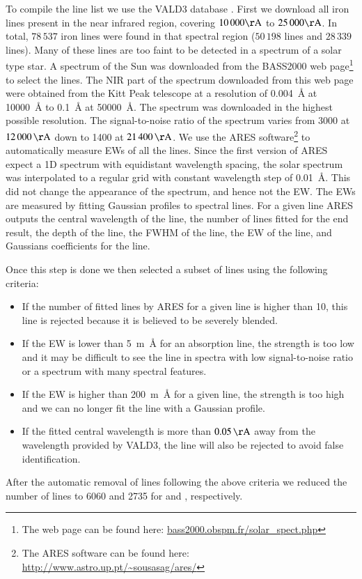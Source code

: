 \documentclass{aa}
\begin{document}
To compile the line list we use the VALD3 database \citep{VALD1,VALD2}.
First we download all iron lines present in the near infrared
region, covering $10\,000\si{\AA}$ to $25\,000\si{\AA}$. In
total, $78\,537$ iron lines were found in that spectral region
($50\,198$  lines and $28\,339$  lines).
Many of these lines are too faint to be detected in a spectrum
of a solar type star. A spectrum of the Sun was downloaded from
the BASS2000 web page\footnote{The web page can be found here:
\url{bass2000.obspm.fr/solar_spect.php}} to select the lines. The
NIR part of the spectrum downloaded from this web page were obtained
from the Kitt Peak telescope \citep{Hinkle1995} at a resolution of
\SI{0.004}{\angstrom} at \SI{10000}{\angstrom} to \SI{0.1}{\angstrom}
at \SI{50000}{\angstrom}. The spectrum was downloaded in the highest
possible resolution. The signal-to-noise ratio of the spectrum varies
from 3000 at $\SI{12000}{\AA}$ down to 1400 at $\SI{21400}{\AA}$. We
use the ARES software\footnote{The ARES software can be found here:
\url{http://www.astro.up.pt/~sousasag/ares/}}\citep{Sousa2007,Sousa2015a}
to automatically measure EWs of all the lines. Since the first version
of ARES expect a 1D spectrum with equidistant wavelength spacing,
the solar spectrum was interpolated to a regular grid with constant
wavelength step of \SI{0.01}{\angstrom}. This did not change the appearance
of the spectrum, and hence not the EW.
The EWs are measured by fitting
Gaussian profiles to spectral lines. For a given line ARES outputs the
central wavelength of the line, the number of lines fitted for the end
result, the depth of the line, the FWHM of the line, the EW of the line,
and Gaussians coefficients for the line.

Once this step is done we then selected a subset of lines using the
following criteria:
\begin{itemize}
    \item If the number of fitted lines by ARES for a given line is higher than 10,
        this line is rejected because it is believed to be severely blended.
    \item If the EW is lower than \SI{5}{m\angstrom} for an absorption line, the strength
        is too low and it may be difficult to see the line in spectra with low
        signal-to-noise ratio or a spectrum with many spectral features.
    \item If the EW is higher than \SI{200}{m\angstrom} for a given line, the strength
        is too high and we can no longer fit the line with a Gaussian profile.
    \item If the fitted central wavelength is more than $\SI{0.05}{\AA}$ away
        from the wavelength provided by VALD3, the line will also be rejected to
        avoid false identification.
\end{itemize}
After the automatic removal of lines following the above criteria
we reduced the number of lines to 6060 and 2735 for  and
, respectively.
\end{document}
